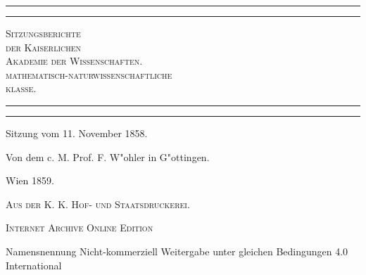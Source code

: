 \documentclass[a4paper, 11pt, oneside]{article}
\begin{document}
\swabfamily
\renewcommand{\contentsname}{
\swabfamily{Inhaltsverzeichnis}
}
\begin{titlepage} %
	\centering %

	
	\rule{\textwidth}{1.6pt}\vspace*{-\baselineskip}\vspace*{2pt} %
	\rule{\textwidth}{0.4pt} %
	
	\vspace{1\baselineskip} %
	
	{\scshape\Huge Sitzungsberichte\\[1.25pt] der Kaiserlichen\\[1.25pt] Akademie der Wissenschaften.\\[1.25pt] mathematisch-naturwissenschaftliche\\[1.25pt] klasse.\\[1.25pt]}
	
	\vspace{1\baselineskip} %

	\rule{\textwidth}{0.4pt}\vspace*{-\baselineskip}\vspace{3.2pt} %
	\rule{\textwidth}{1.6pt} %
	
	\vspace{1\baselineskip} %
	
	
	{\LARGE Sitzung vom 11. November 1858.} %
	
	\vspace*{1\baselineskip} %
	
    {\LARGE Von dem c. M. Prof. F. W"ohler in G"ottingen.} %
    
    \vspace*{\fill}

	\vspace{1\baselineskip}

	{\Large Wien 1859.}
	
	{\Large\scshape{Aus der K. K. Hof- und Staatsdruckerei.}}
	
	\vspace{0.5\baselineskip} %

    \Large\scshape Internet Archive Online Edition  %
	
	{\Large Namensnennung Nicht-kommerziell Weitergabe unter gleichen Bedingungen 4.0 International} %
\end{titlepage}
\end{document}
